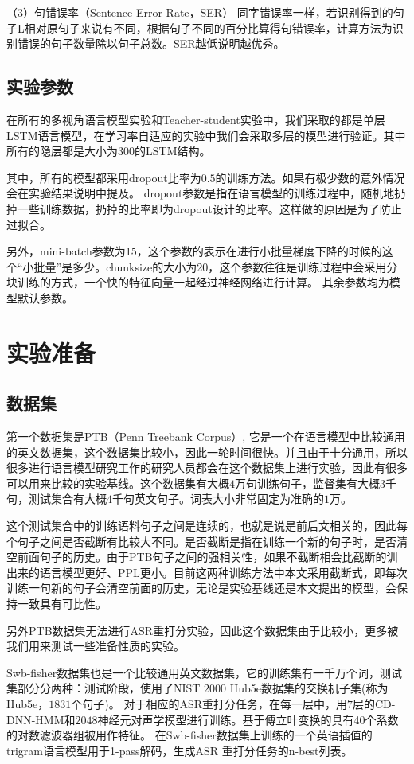（3）句错误率（Sentence Error Rate，SER）
同字错误率一样，若识别得到的句子L相对原句子来说有不同，根据句子不同的百分比算得句错误率，计算方法为识别错误的句子数量除以句子总数。SER越低说明越优秀。

\subsection{实验参数}
在所有的多视角语言模型实验和Teacher-student实验中，我们采取的都是单层LSTM语言模型，在学习率自适应的实验中我们会采取多层的模型进行验证。其中所有的隐层都是大小为300的LSTM结构。

其中，所有的模型都采用dropout比率为$0.5$的训练方法。如果有极少数的意外情况会在实验结果说明中提及。
dropout参数是指在语言模型的训练过程中，随机地扔掉一些训练数据，扔掉的比率即为dropout设计的比率。这样做的原因是为了防止过拟合。

另外，mini-batch参数为15，这个参数的表示在进行小批量梯度下降的时候的这个“小批量”是多少。chunksize的大小为20，这个参数往往是训练过程中会采用分块训练的方式，一个快的特征向量一起经过神经网络进行计算。
其余参数均为模型默认参数。

\section{实验准备}
\subsection{数据集}
第一个数据集是PTB（Penn Treebank Corpus）\cite{Taylor2003The}, 
它是一个在语言模型中比较通用的英文数据集，这个数据集比较小，因此一轮时间很快。并且由于十分通用，所以很多进行语言模型研究工作的研究人员都会在这个数据集上进行实验，因此有很多可以用来比较的实验基线。这个数据集有大概$4$万句训练句子，监督集有大概$3$千句，测试集合有大概$4$千句英文句子。词表大小非常固定为准确的$1$万。

这个测试集合中的训练语料句子之间是连续的，也就是说是前后文相关的，因此每个句子之间是否截断有比较大不同。是否截断是指在训练一个新的句子时，是否清空前面句子的历史。由于PTB句子之间的强相关性，如果不截断相会比截断的训出来的语言模型更好、PPL更小。目前这两种训练方法中本文采用截断式，即每次训练一句新的句子会清空前面的历史，无论是实验基线还是本文提出的模型，会保持一致具有可比性。

另外PTB数据集无法进行ASR重打分实验，因此这个数据集由于比较小，更多被我们用来测试一些准备性质的实验。


Swb-fisher数据集也是一个比较通用英文数据集，它的训练集有一千万个词，测试集部分分两种：测试阶段，使用了NIST $2000$ Hub5e数据集的交换机子集(称为Hub5e，$1831$个句子)。
对于相应的ASR重打分任务，在每一层中，用$7$层的CD-DNN-HMM和$2048$神经元对声学模型进行训练。基于傅立叶变换的具有40个系数的对数滤波器组被用作特征。
在Swb-fisher数据集上训练的一个英语插值的trigram语言模型用于1-pass解码，生成ASR 重打分任务的n-best列表。

